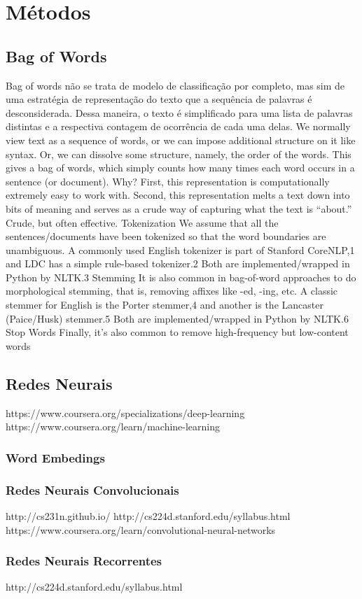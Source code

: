 \chapter{Métodos}
\noindent
\section{Bag of Words}
Bag of words não se trata de modelo de classificação por completo, mas sim de uma estratégia de representação do texto que a sequência de palavras é desconsiderada. Dessa maneira, o texto é simplificado para uma lista de palavras distintas e a respectiva contagem de ocorrência de cada uma delas.
We normally view text as a sequence of words, or we can impose additional structure on it like syntax. Or,
we can dissolve some structure, namely, the order of the words. This gives a bag of words, which simply
counts how many times each word occurs in a sentence (or document).
Why? First, this representation is computationally extremely easy to work with. Second, this representation
melts a text down into bits of meaning and serves as a crude way of capturing what the text is
“about.” Crude, but often effective.
Tokenization We assume that all the sentences/documents have been tokenized so that the word boundaries
are unambiguous. A commonly used English tokenizer is part of Stanford CoreNLP,1 and LDC has a
simple rule-based tokenizer.2 Both are implemented/wrapped in Python by NLTK.3
Stemming It is also common in bag-of-word approaches to do morphological stemming, that is, removing
affixes like -ed, -ing, etc. A classic stemmer for English is the Porter stemmer,4 and another is the
Lancaster (Paice/Husk) stemmer.5 Both are implemented/wrapped in Python by NLTK.6
Stop Words Finally, it’s also common to remove high-frequency but low-content words

\section{Redes Neurais}
https://www.coursera.org/specializations/deep-learning
https://www.coursera.org/learn/machine-learning
\subsection{Word Embedings}
\subsection{Redes Neurais Convolucionais}
http://cs231n.github.io/
http://cs224d.stanford.edu/syllabus.html
https://www.coursera.org/learn/convolutional-neural-networks
\subsection{Redes Neurais Recorrentes}
http://cs224d.stanford.edu/syllabus.html